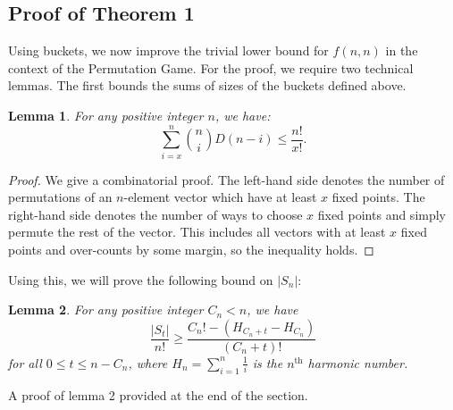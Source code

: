 \documentclass[12pt, a4paper]{article}
\newcommand{\nth}{^{\text{th}}}       %
\newtheorem{lemma}{Lemma}
\begin{document}
	\subsection{Proof of Theorem 1}
	Using buckets, we now improve the trivial lower bound for $f(n, n)$ in the context of the Permutation Game. For the proof, we require two technical lemmas. The first bounds the sums of sizes of the buckets defined above.
		 \begin{lemma}  For any positive integer $n$, we have:
		 	\begin{equation*}
		 	\sum_{i=x}^n\binom{n}{i}D(n-i) \le \frac{n!}{x!}.
		 	\end{equation*}
		 \end{lemma}
		 	\begin{proof}
		 		We give a combinatorial proof. The left-hand side denotes the number of permutations of an $n$-element vector which have at least $x$ fixed points. The right-hand side denotes the number of ways to choose $x$ fixed points and simply permute the rest of the vector. This includes all vectors with at least $x$ fixed points and over-counts by some margin, so the inequality holds.
		 	\end{proof}
		 Using this, we will prove the following bound on $|S_n|$:
		 \begin{lemma} For any positive integer $C_n < n$, we have
		 	\begin{equation*}
		 	\frac{|S_t|}{n!}\ge \frac{C_{n}! - (H_{C_{n}+t} - H_{C_{n}})}{(C_n+t)!}
		 	\end{equation*}
		 	for all $0\le t\le n-C_{n}$, where $H_n=\sum_{i = 1}^n\frac{1}{i}$ is the $n\nth$ harmonic number.
		 \end{lemma}
		 A proof of lemma 2 provided at the end of the section.\\
\end{document}
